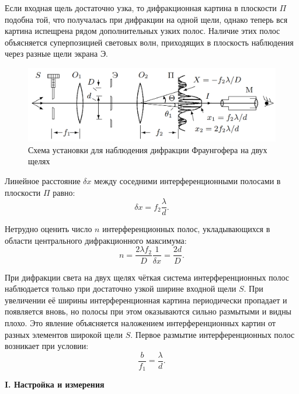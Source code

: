 \documentclass[12pt,a4paper]{article}
\begin{document}
	Если входная щель достаточно узка, то дифракционная картина в плоскости $\Pi$ подобна той, что получалась при дифракции на одной щели, однако теперь вся картина испещрена рядом дополнительных узких полос. Наличие этих полос объясняется суперпозицией световых волн, приходящих в плоскость наблюдения через разные щели экрана Э.
	\begin{figure}[h!]
		\centering
		\includegraphics[scale=0.5]{res/Double}
		\caption{Схема установки для наблюдения дифракции Фраунгофера на двух щелях}
	\end{figure}

	Линейное расстояние $\delta x$ между соседними интерференционными полосами в плоскости $\Pi$ равно:
	\begin{equation*}
		\delta x = f_2 \frac{\lambda}{d}.
	\end{equation*}

	Нетрудно оценить число $n$ интерференционных полос, укладывающихся в области центрального дифракционного максимума:
	\begin{equation*}
		n = \frac{2\lambda f_2}{D} \frac{1}{\delta x} = \frac{2d}{D}.
	\end{equation*}
	
	
	При дифракции света на двух щелях чёткая система интерференционных полос наблюдается только при достаточно узкой ширине входной щели $S$. При увеличении её ширины интерференционная картина периодически пропадает и появляется вновь, но полосы при этом оказываются сильно размытыми и видны плохо. Это явление объясняется наложением интерференционных картин от разных элементов широкой щели $S$. Первое размытие интерференционных полос возникает при условии:
	\begin{equation*}
		\frac{b}{f_1} = \frac{\lambda}{d}.
	\end{equation*}


	\begin{center}
		\textbf{I. Настройка и измерения}
	\end{center}
	
\end{document}

